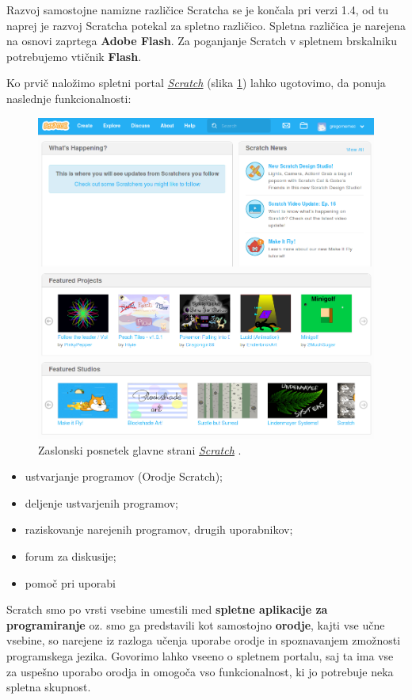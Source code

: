 Razvoj samostojne namizne različice Scratcha se je končala pri verzi
1.4, od tu naprej je razvoj Scratcha potekal za spletno
različico. Spletna različica je narejena na osnovi zaprtega
\textbf{Adobe Flash}. Za poganjanje Scratch v spletnem brskalniku
potrebujemo vtičnik \textbf{Flash}.

Ko prvič naložimo spletni portal
\emph{\href{https://scratch.mit.edu/}{Scratch}} (slika
\ref{fig:web:scratch:main}) lahko ugotovimo, da ponuja naslednje
funkcionalnosti:

\begin{figure}[h!]
  \centering
    \includegraphics [width=0.90\linewidth, keepaspectratio =
   1] {./images/sc_web/scratch_mainP-v01.png}
   \caption{Zaslonski posnetek glavne strani
     \emph{\href{https://scratch.mit.edu/}{Scratch}}
     \cite{web:scratch}.}
    \label{fig:web:scratch:main}
\end{figure}

\begin{itemize}
\item ustvarjanje programov (Orodje Scratch);
\item deljenje ustvarjenih programov;
\item raziskovanje narejenih programov, drugih uporabnikov;
\item forum za diskusije;
\item pomoč pri uporabi
\end{itemize}

Scratch smo po vrsti vsebine umestili med \textbf{spletne aplikacije
  za programiranje} oz. smo ga predstavili kot samostojno
\textbf{orodje}, kajti vse učne vsebine, so narejene iz razloga učenja
uporabe orodje in spoznavanjem zmožnosti programskega jezika. Govorimo
lahko vseeno o spletnem portalu, saj ta ima vse za uspešno uporabo
orodja in omogoča vso funkcionalnost, ki jo potrebuje neka spletna
skupnost.

